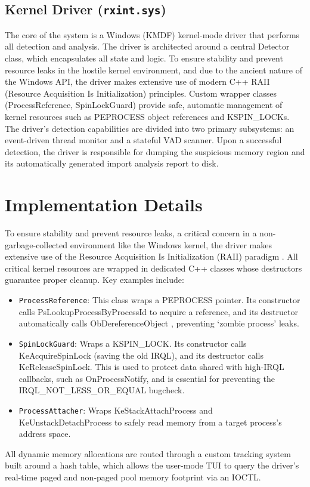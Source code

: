 \documentclass[journal]{IEEEtran}
\begin{document}
\subsection{Kernel Driver (\texttt{rxint.sys})}
The core of the system is a Windows (KMDF) kernel-mode driver that performs all detection and analysis. The driver is architected around a central Detector class, which encapsulates all state and logic. To ensure stability and prevent resource leaks in the hostile kernel environment, and due to the ancient nature of the Windows API, the driver makes extensive use of modern C++ RAII (Resource Acquisition Is Initialization) principles. Custom wrapper classes (ProcessReference, SpinLockGuard) provide safe, automatic management of kernel resources such as PEPROCESS object references and KSPIN\_LOCKs. The driver's detection capabilities are divided into two primary subsystems: an event-driven thread monitor and a stateful VAD scanner. Upon a successful detection, the driver is responsible for dumping the suspicious memory region and its automatically generated import analysis report to disk.

\section{Implementation Details}\label{sec:implementation}
To ensure stability and prevent resource leaks, a critical concern in a non-garbage-collected environment like the Windows kernel, the driver makes extensive use of the Resource Acquisition Is Initialization (RAII) paradigm \cite{stroustrup2013cpp}. All critical kernel resources are wrapped in dedicated C++ classes whose destructors guarantee proper cleanup. Key examples include:
\begin{itemize}
\item \texttt{ProcessReference}: This class wraps a PEPROCESS pointer. Its constructor calls PsLookupProcessByProcessId \cite{microsoftPsLookup} to acquire a reference, and its destructor automatically calls ObDereferenceObject \cite{microsoftObDeref}, preventing `zombie process' leaks.
\item \texttt{SpinLockGuard}: Wraps a KSPIN\_LOCK. Its constructor calls KeAcquireSpinLock (saving the old IRQL), and its destructor calls KeReleaseSpinLock. This is used to protect data shared with high-IRQL callbacks, such as OnProcessNotify, and is essential for preventing the IRQL\_NOT\_LESS\_OR\_EQUAL bugcheck.
\item \texttt{ProcessAttacher}: Wraps KeStackAttachProcess \cite{microsoftKeStackAttach} and KeUnstackDetachProcess \cite{microsoftKeUnstackDetach} to safely read memory from a target process's address space.
\end{itemize}
All dynamic memory allocations are routed through a custom tracking system built around a hash table, which allows the user-mode TUI to query the driver's real-time paged and non-paged pool memory footprint via an IOCTL.
\end{document}
